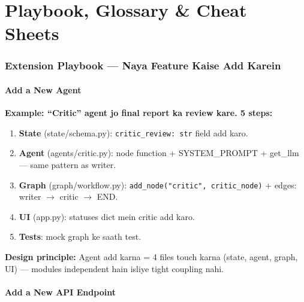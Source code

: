 \newpage

\part{Playbook, Glossary \& Cheat Sheets}

\section{Extension Playbook --- Naya Feature Kaise Add Karein}

\subsection{Add a New Agent}

\begin{codestorybox}
\textbf{Example: ``Critic'' agent jo final report ka review kare. 5 steps:}

\begin{enumerate}[label=\arabic*.]
\item \textbf{State} (state/schema.py): \texttt{critic\_review: str} field add karo.
\item \textbf{Agent} (agents/critic.py): node function + SYSTEM\_PROMPT + get\_llm --- same pattern as writer.
\item \textbf{Graph} (graph/workflow.py): \texttt{add\_node("critic", critic\_node)} + edges: writer $\rightarrow$ critic $\rightarrow$ END.
\item \textbf{UI} (app.py): statuses dict mein critic add karo.
\item \textbf{Tests}: mock graph ke saath test.
\end{enumerate}

\textbf{Design principle:} Agent add karna = 4 files touch karna (state, agent, graph, UI) --- modules independent hain isliye tight coupling nahi.
\end{codestorybox}

\subsection{Add a New API Endpoint}

